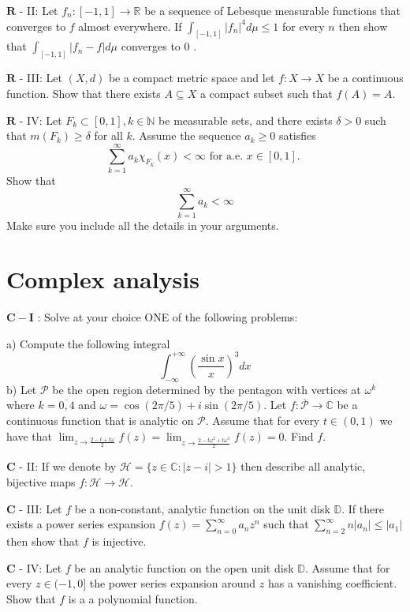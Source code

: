 \documentclass[10pt]{article}
\begin{document}
$\mathbf{R}$ - II: Let $f_{n}:[-1,1] \rightarrow \mathbb{R}$ be a sequence of Lebesque measurable functions that converges to $f$ almost everywhere. If $\int_{[-1,1]}\left|f_{n}\right|^{4} d \mu \leq 1$ for every $n$ then show that $\int_{[-1,1]}\left|f_{n}-f\right| d \mu$ converges to 0 .

$\mathbf{R}$ - III: Let $(X, d)$ be a compact metric space and let $f: X \rightarrow X$ be a continuous function. Show that there exists $A \subseteq X$ a compact subset such that $f(A)=A$.

$\mathbf{R}$ - IV: Let $F_{k} \subset[0,1], k \in \mathbb{N}$ be measurable sets, and there exists $\delta>0$ such that $m\left(F_{k}\right) \geq \delta$ for all $k$. Assume the sequence $a_{k} \geq 0$ satisfies
$$
\sum_{k=1}^{\infty} a_{k} \chi_{F_{k}}(x)<\infty \text { for a.e. } x \in[0,1] \text {. }
$$
Show that
$$
\sum_{k=1}^{\infty} a_{k}<\infty
$$
Make sure you include all the details in your arguments.

\section{Complex analysis}
$\mathbf{C}-\mathbf{I}$ : Solve at your choice ONE of the following problems:

a) Compute the following integral
$$
\int_{-\infty}^{+\infty}\left(\frac{\sin x}{x}\right)^{3} d x
$$
b) Let $\mathcal{P}$ be the open region determined by the pentagon with vertices at $\omega^{k}$ where $k=\overline{0,4}$ and $\omega=\cos (2 \pi / 5)+i \sin (2 \pi / 5)$. Let $f: \overline{\mathcal{P}} \rightarrow \mathbb{C}$ be a continuous function that is analytic on $\mathcal{P}$. Assume that for every $t \in(0,1)$ we have that $\lim _{z \rightarrow \frac{2-t+t \omega}{2}} f(z)=\lim _{z \rightarrow \frac{2-t \omega^{2}+t \omega^{3}}{2}} f(z)=0$. Find $f$.

$\mathbf{C}$ - II: If we denote by $\mathcal{H}=\{z \in \mathbb{C}:|z-i|>1\}$ then describe all analytic, bijective maps $f: \mathcal{H} \rightarrow \mathcal{H}$.

$\mathbf{C}$ - III: Let $f$ be a non-constant, analytic function on the unit disk $\mathbb{D}$. If there exists a power series expansion $f(z)=\sum_{n=0}^{\infty} a_{n} z^{n}$ such that $\sum_{n=2}^{\infty} n\left|a_{n}\right| \leq\left|a_{1}\right|$ then show that $f$ is injective.

$\mathbf{C}$ - IV: Let $f$ be an analytic function on the open unit disk $\mathbb{D}$. Assume that for every $z \in(-1,0]$ the power series expansion around $z$ has a vanishing coefficient. Show that $f$ is a a polynomial function.
\end{document}
